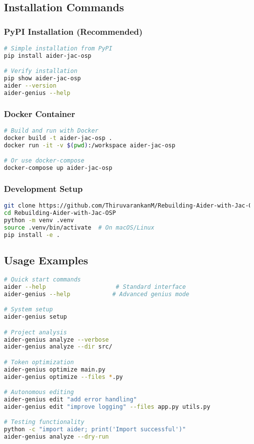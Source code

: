 \documentclass[12pt,a4paper]{article}
\begin{document}
\subsection{Installation Commands}

\subsubsection{PyPI Installation (Recommended)}
\begin{lstlisting}[language=bash]
# Simple installation from PyPI
pip install aider-jac-osp

# Verify installation
pip show aider-jac-osp
aider --version
aider-genius --help
\end{lstlisting}

\subsubsection{Docker Container}
\begin{lstlisting}[language=bash]
# Build and run with Docker
docker build -t aider-jac-osp .
docker run -it -v $(pwd):/workspace aider-jac-osp

# Or use docker-compose
docker-compose up aider-jac-osp
\end{lstlisting}

\subsubsection{Development Setup}
\begin{lstlisting}[language=bash]
git clone https://github.com/ThiruvarankanM/Rebuilding-Aider-with-Jac-OSP.git
cd Rebuilding-Aider-with-Jac-OSP
python -m venv .venv
source .venv/bin/activate  # On macOS/Linux
pip install -e .
\end{lstlisting}

\subsection{Usage Examples}
\begin{lstlisting}[language=bash]
# Quick start commands
aider --help                    # Standard interface
aider-genius --help            # Advanced genius mode

# System setup
aider-genius setup

# Project analysis
aider-genius analyze --verbose
aider-genius analyze --dir src/

# Token optimization
aider-genius optimize main.py
aider-genius optimize --files *.py

# Autonomous editing
aider-genius edit "add error handling"
aider-genius edit "improve logging" --files app.py utils.py

# Testing functionality
python -c "import aider; print('Import successful')"
aider-genius analyze --dry-run
\end{lstlisting}
\end{document}
